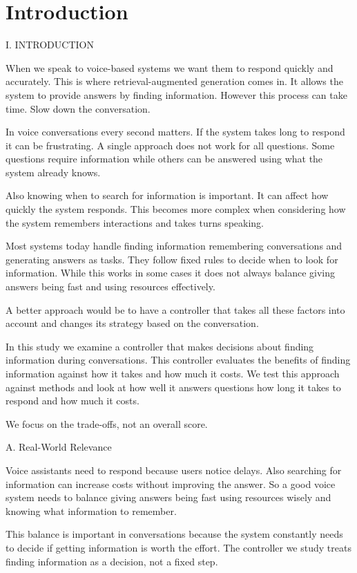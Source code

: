 \section{Introduction}

I. INTRODUCTION

When we speak to voice-based systems we want them to respond quickly and accurately. This is where retrieval-augmented generation comes in. It allows the system to provide answers by finding information. However this process can take time. Slow down the conversation.

In voice conversations every second matters. If the system takes long to respond it can be frustrating. A single approach does not work for all questions. Some questions require information while others can be answered using what the system already knows.

Also knowing when to search for information is important. It can affect how quickly the system responds. This becomes more complex when considering how the system remembers interactions and takes turns speaking.

Most systems today handle finding information remembering conversations and generating answers as tasks. They follow fixed rules to decide when to look for information. While this works in some cases it does not always balance giving answers being fast and using resources effectively.

A better approach would be to have a controller that takes all these factors into account and changes its strategy based on the conversation.

In this study we examine a controller that makes decisions about finding information during conversations. This controller evaluates the benefits of finding information against how it takes and how much it costs. We test this approach against methods and look at how well it answers questions how long it takes to respond and how much it costs.

We focus on the trade-offs, not an overall score.

A. Real-World Relevance

Voice assistants need to respond because users notice delays. Also searching for information can increase costs without improving the answer. So a good voice system needs to balance giving answers being fast using resources wisely and knowing what information to remember.

This balance is important in conversations because the system constantly needs to decide if getting information is worth the effort. The controller we study treats finding information as a decision, not a fixed step.

